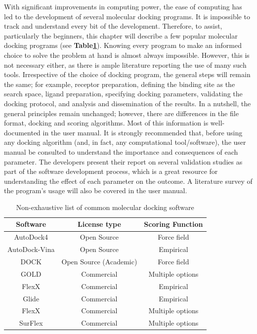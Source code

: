 \documentclass[12pt]{article}
\begin{document}
With significant improvements in computing power, the ease of computing has led to the development of several molecular docking programs. It is impossible to track and understand every bit of the development. Therefore, to assist, particularly the beginners, this chapter will describe a few popular molecular docking programs (see \textbf{Table\ref{tab:List}}).  Knowing every program to make an informed choice to solve the problem at hand is almost always impossible. However, this is not necessary either, as there is ample literature reporting the use of many such tools. Irrespective of the choice of docking program, the general steps will remain the same; for example, receptor preparation, defining the binding site as the search space, ligand preparation, specifying docking parameters, validating the docking protocol, and analysis and dissemination of the results.  In a nutshell, the general principles remain unchanged; however, there are differences in the file format, docking and scoring algorithms. Most of this information is well-documented in the user manual. It is strongly recommended that, before using any docking algorithm (and, in fact, any computational tool/software), the user manual be consulted to understand the importance and consequences of each parameter. The developers present their report on several validation studies as part of the software development process, which is a great resource for understanding the effect of each parameter on the outcome. A literature survey of the program's usage will also be covered in the user manual. 

\begin{table}[ht]
    \centering
    \caption{Non-exhaustive list of common molecular docking software}
    \label{tab:List}
    \begin{tabular}{c c c }
    \hline
         \textbf{Software} & \textbf{License type} & \textbf{Scoring Function}  \\
    \hline
        AutoDock4 & Open Source & Force field  \\
        AutoDock-Vina & Open Source & Empirical  \\
        DOCK & Open Source (Academic) & Force field  \\
        GOLD &  Commercial & Multiple options \\
        FlexX &  Commercial & Empirical \\
        Glide &  Commercial & Empirical \\
        FlexX & Commercial & Multiple options \\
        SurFlex & Commercial & Multiple options \\
    \hline
    \end{tabular}
\end{table}
\end{document}
